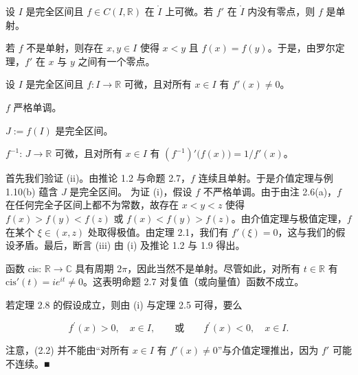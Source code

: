 \begin{proposition}

设 $ I $ 是完全区间且 $ f \in C(I, \mathbb{R}) $ 在 $ \mathring{I} $ 上可微。若 $ f' $ 在 $ \mathring{I} $ 内没有零点，则 $ f $ 是单射。

\proofhead
若 $f$ 不是单射，则存在 $x, y \in I$ 使得 $x < y$ 且 $f(x) = f(y)$。于是，由罗尔定理，$f'$ 在 $x$ 与 $y$ 之间有一个零点。
\end{proposition}

\begin{theorem}

设 $ I $ 是完全区间且 $ f: I \to \mathbb{R} $ 可微，且对所有 $ x \in I $ 有 $ f'(x) \neq 0 $。

\begin{subitems}
\item

$f$ 严格单调。

\item

$J := f(I)$ 是完全区间。

\item

$ f^{-1} $: $ J \to \mathbb{R} $ 可微，且对所有 $ x \in I $ 有 $ (f^{-1})' \big(f(x)\big) = 1/f'(x) $。

\proofhead
首先我们验证 (ii)。由推论 1.2 与命题 2.7，$f$ 连续且单射。于是介值定理与例 1.10(b) 蕴含 $J$ 是完全区间。
为证 (i)，假设 $f$ 不严格单调。由于由注 2.6(a)，$f$ 在任何完全子区间上都不为常数，故存在 $x < y < z$ 使得 $f(x) > f(y) < f(z)$ 或 $f(x) < f(y) > f(z)$。由介值定理与极值定理，$f$ 在某个 $\xi \in (x, z)$ 处取得极值。由定理 2.1，我们有 $f'(\xi) = 0$，这与我们的假设矛盾。最后，断言 (iii) 由 (i) 及推论 1.2 与 1.9 得出。
\end{subitems}

\end{theorem}

\begin{remark}

\begin{items}
\item

函数 cis: $ \mathbb{R} \to \mathbb{C} $ 具有周期 $ 2\pi $，因此当然不是单射。尽管如此，对所有 $ t \in \mathbb{R} $ 有 $ \mathrm{cis}'(t) = ie^{it} \neq 0 $。这表明命题 2.7 对复值（或向量值）函数不成立。

\item

若定理 2.8 的假设成立，则由 (i) 与定理 2.5 可得，要么

\begin{equation}
f^{\prime}(x)>0,\quad x\in I,\qquad\text{或}\qquad f^{\prime}(x)<0,\quad x\in I.
\end{equation}

注意，(2.2) 并不能由“对所有 $ x \in I $ 有 $ f'(x) \neq 0 $”与介值定理推出，因为 $ f' $ 可能不连续。■

\end{items}

\end{remark}


